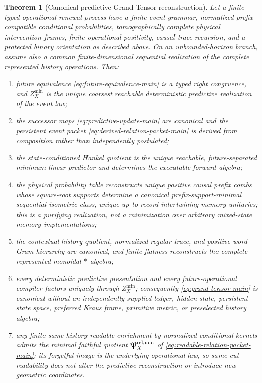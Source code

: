 \documentclass[11pt]{article}
\newtheorem{theorem}{Theorem}[section]
\numberwithin{equation}{section}
\theoremstyle{definition}
\theoremstyle{remark}
\begin{document}
\begin{theorem}[Canonical predictive Grand-Tensor reconstruction]
\label{mt:grand-tensor}
Let a finite typed operational renewal process have a finite event grammar,
normalized prefix-compatible conditional probabilities, tomographically
complete physical intervention frames, finite operational positivity, causal
trace recursion, and a protected binary orientation as described above. On an unbounded-horizon
branch, assume also a common finite-dimensional sequential realization of
the complete represented history operations. Then:
\begin{enumerate}[label=\textup{(\roman*)},leftmargin=2.8em]
\item future equivalence \eqref{eq:future-equivalence-main} is a typed right
      congruence, and $Z_X^{\min}$ is the unique coarsest reachable
      deterministic predictive realization of the event law;
\item the successor maps \eqref{eq:predictive-update-main} are canonical and
      the persistent event packet \eqref{eq:derived-relation-packet-main} is
      derived from composition rather than independently postulated;
\item the state-conditioned Hankel quotient is the unique reachable,
      future-separated minimum linear predictor and determines the executable
      forward algebra;
\item the physical probability table reconstructs unique positive causal
      prefix combs whose square-root supports determine a canonical
      prefix-support-minimal sequential isometric class, unique up to
      record-intertwining memory unitaries; this is a purifying realization,
      not a minimization over arbitrary mixed-state memory implementations;
\item the contextual history quotient, normalized regular trace, and positive
      word-Gram hierarchy are canonical, and finite flatness reconstructs the
      complete represented monoidal $*$-algebra;
\item every deterministic predictive presentation and every future-operational
      compiler factors uniquely through $Z_X^{\min}$; consequently
      \eqref{eq:grand-tensor-main} is canonical without an independently
      supplied ledger, hidden state, persistent state space, preferred Kraus
      frame, primitive metric, or preselected history algebra;
\item any finite same-history readable enrichment by normalized
      conditional kernels admits the minimal faithful quotient
      $\mathfrak P_X^{\rm rel,min}$ of
      \eqref{eq:readable-relation-packet-main}; its forgetful image is the
      underlying operational law, so same-cut readability does not alter the
      predictive reconstruction or introduce new geometric coordinates.
\end{enumerate}
\end{theorem}
\end{document}
